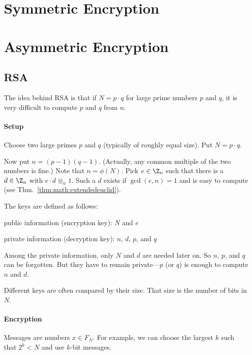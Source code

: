 \section{Symmetric Encryption}\label{sec:sd:crypto:sym}


\section{Asymmetric Encryption}\label{sec:sd:crypto:asym}

\subsection{RSA}

The idea behind RSA is that if $N=p\cdot q$ for large prime numbers $p$ and $q$, it is very difficult to compute $p$ and $q$ from $n$.

\paragraph{Setup}
Choose two large primes $p$ and $q$ (typically of roughly equal size).
Put $N=p\cdot q$.

Now put $n=(p-1)(q-1)$. (Actually, any common multiple of the two numbers is fine.)
Note that $n=\phi(N)$.
Pick $e\in \Z_n$ such that there is a $d\in\Z_n$ with $e\cdot d\Equiv_n 1$.
Such a $d$ exists if $\gcd(e,n)=1$ and is easy to compute (see Thm.~\ref{thm:math:extendedeuclid}).

The keys are defined as follows:
\begin{compactitem}
 \item public information (encryption key): $N$ and $e$
 \item private information (decryption key): $n$, $d$, $p$, and $q$
\end{compactitem}
Among the private information, only $N$ and $d$ are needed later on.
So $n$, $p$, and $q$ can be forgotten.
But they have to remain private---$p$ (or $q$) is enough to compute $n$ and $d$.

Different keys are often compared by their size.
That size is the number of bits in $N$.

\paragraph{Encryption}
Messages are numbers $x\in F_N$.
For example, we can choose the largest $k$ such that $2^k<N$ and use $k$-bit messages.

